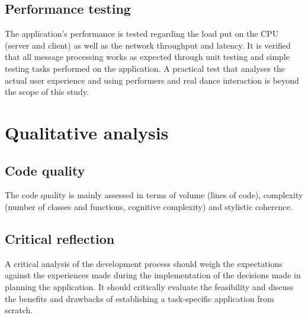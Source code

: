 \subsection{Performance testing}

The application's performance is tested regarding the load put on the \ac{CPU} (server and client) as well as the network throughput and latency. It is verified that all message processing works as expected through unit testing and simple testing tasks performed on the application. A practical test that analyses the actual user experience and using performers and real dance interaction is beyond the scope of this study.

\section{Qualitative analysis}

\subsection{Code quality}

The code quality is mainly assessed in terms of volume (lines of code), complexity (number of classes and functions, cognitive complexity) and stylistic coherence.

\subsection{Critical reflection}

A critical analysis of the development process should weigh the expectations against the experiences made during the implementation of the decisions made in planning the application. It should critically evaluate the feasibility and discuss the benefits and drawbacks of establishing a task-specific application from scratch.
